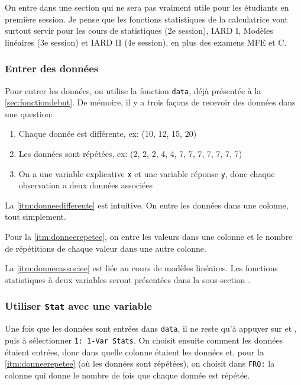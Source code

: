 On entre dans une section qui ne sera pas vraiment utile pour les étudiants en première session. Je pense que les fonctions statistiques de la calculatrice vont surtout servir pour les cours de statistiques (2e session), IARD I, Modèles linéaires (3e session) et IARD II (4e session), en plus des examens MFE et C.

\subsubsection{Entrer des données}
\label{subsec:EntrerDonnees}

Pour entrer les données, on utilise la fonction \texttt{data}, déjà présentée à la \autoref{sec:fonctiondebut}. De mémoire, il y a trois façons de recevoir des données dans une question:

\begin{enumerate}

\item Chaque donnée est différente, ex: (10, 12, 15, 20)
\label{itm:donneedifferente}

\item Les données sont répétées, ex: (2, 2, 2, 4, 4, 7, 7, 7, 7, 7, 7, 7)
\label{itm:donneerepetee}

\item On a une variable explicative \texttt{x} et une variable réponse \texttt{y}, donc chaque observation a deux données associées
\label{itm:donneeassociee}

\end{enumerate}

La \autoref{itm:donneedifferente} est intuitive. On entre les données dans une colonne, tout simplement.

Pour la \autoref{itm:donneerepetee}, on entre les valeurs dans une colonne et le nombre de répétitions de chaque valeur dans une autre colonne.

La \autoref{itm:donneeassociee} est liée au cours de modèles linéaires. Les fonctions statistiques à deux variables seront présentées dans la sous-section .

\subsubsection{Utiliser \texttt{Stat} avec une variable}

Une fois que les données sont entrées dans \texttt{data}, il ne reste qu'à appuyer sur  et , puis à sélectionner \texttt{1: 1-Var Stats}. On choisit ensuite comment les données étaient entrées, donc dans quelle colonne étaient les données et, pour la \autoref{itm:donneerepetee} (où les données sont répétées), on choisit dans \texttt{FRQ:} la colonne qui donne le nombre de fois que chaque donnée est répétée.

